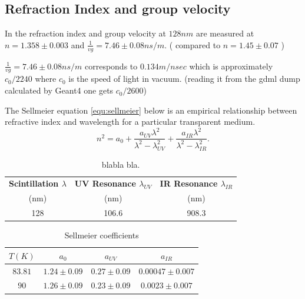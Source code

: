 \documentclass{article}
\begin{document}
\subsection{Refraction Index and group velocity}

In \cite{ref:vg} the refraction index and group velocity  at $128 nm$ are measured at $n = 1.358 \pm 0.003$ and $\frac{1}{vg} = 7.46 \pm 0.08 ns/m$.
( compared to $n= 1.45 \pm 0.07$ \cite{ref:grace})

$\frac{1}{vg} = 7.46 \pm 0.08 ns/m$ corresponds to $0.134 m/nsec$ which is approximately $c_0/2240$ where $c_0$ is the speed of light in vacuum.
(reading it from the gdml dump calculated by Geant4 one gets $c_0/2600$)



The Sellmeier equation \ref{equ:sellmeier} below is an empirical relationship between refractive index and wavelength for a particular transparent medium.
\begin{equation}
n^2 = a_0 + \frac{a_{UV} \lambda^2}{\lambda^2 -\lambda^2_{UV}}+\frac{a_{IR}\lambda^2}{\lambda^2 - \lambda^2_{IR}}.
 \label{equ:sellmeier}
\end{equation}

 \begin{table}[h!]
  \begin{center}
    \label{tab:table3}
    \begin{tabular}{|c|c|c|} 
      \hline
      \textbf{ Scintillation $\lambda$} &\textbf{UV Resonance $\lambda_{UV}$} &\textbf{IR Resonance $\lambda_{IR}$}\\
 (nm)           & (nm)          &(nm) \\
      \hline
128 & 106.6 &908.3\\
      \hline
    \end{tabular}
  \end{center}
  \caption{blabla bla.}
 \end{table}
 
 \begin{table}[h!]
  \begin{center}
    \label{tab:table4}
    \begin{tabular}{|c|c|c|c|} 
      \hline
\textbf{ $T (K) $}& \textbf{ $a_0$} & \textbf{ $a_{UV}$} & \textbf{ $a_{IR}$ }\\
\hline
      $83.81$ & $1.24\pm0.09$ & $0.27\pm0.09$ & $0.00047\pm0.007$ \\
$90$ & $1.26\pm 0.09$& $0.23\pm 0.09$ & $0.0023\pm0.007$ \\
      \hline
    \end{tabular}
  \end{center}
  \caption{Sellmeier coefficients}
 \end{table}
 
\end{document}
